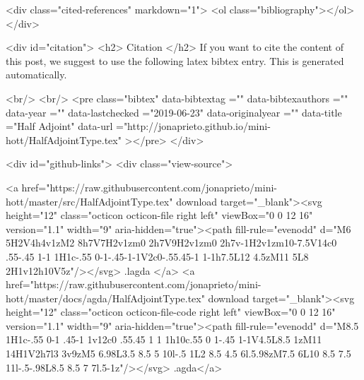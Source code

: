   <div class="cited-references" markdown="1">
  <ol class="bibliography"></ol>
  </div>


  
  <div id="citation">
  <h2> Citation </h2>
  If you want to cite the content of this post,
  we suggest to use the following latex bibtex entry.
  This is generated automatically.

  <br/>
  <br/>
  <pre class="bibtex"
       data-bibtextag =""
       data-bibtexauthors =""
       data-year =""
       data-lastchecked ="2019-06-23"
       data-originalyear =""
       data-title ="Half Adjoint"
       data-url ="http://jonaprieto.github.io/mini-hott/HalfAdjointType.tex"
  ></pre>
  </div>
  

  <div id="github-links">
    <div class="view-source">
      
        <a href="https://raw.githubusercontent.com/jonaprieto/mini-hott/master/src/HalfAdjointType.tex" download target="_blank"><svg height="12" class="octicon octicon-file right left" viewBox="0 0 12 16" version="1.1" width="9" aria-hidden="true"><path fill-rule="evenodd" d="M6 5H2V4h4v1zM2 8h7V7H2v1zm0 2h7V9H2v1zm0 2h7v-1H2v1zm10-7.5V14c0 .55-.45 1-1 1H1c-.55 0-1-.45-1-1V2c0-.55.45-1 1-1h7.5L12 4.5zM11 5L8 2H1v12h10V5z"/></svg> .lagda </a>
        <a href="https://raw.githubusercontent.com/jonaprieto/mini-hott/master/docs/agda/HalfAdjointType.tex" download target="_blank"><svg height="12" class="octicon octicon-file-code right left" viewBox="0 0 12 16" version="1.1" width="9" aria-hidden="true"><path fill-rule="evenodd" d="M8.5 1H1c-.55 0-1 .45-1 1v12c0 .55.45 1 1 1h10c.55 0 1-.45 1-1V4.5L8.5 1zM11 14H1V2h7l3 3v9zM5 6.98L3.5 8.5 5 10l-.5 1L2 8.5 4.5 6l.5.98zM7.5 6L10 8.5 7.5 11l-.5-.98L8.5 8.5 7 7l.5-1z"/></svg> .agda</a>
      
